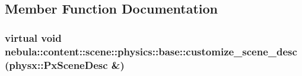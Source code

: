 \subsection{Member Function Documentation}
\hypertarget{classnebula_1_1content_1_1scene_1_1physics_1_1base_a2bd70fe2ca923b841d703cf26e52f931}{
\subsubsection[{customize\_\-scene\_\-desc}]{\setlength{\rightskip}{0pt plus 5cm}virtual void nebula::content::scene::physics::base::customize\_\-scene\_\-desc (physx::PxSceneDesc \&)}}
\label{classnebula_1_1content_1_1scene_1_1physics_1_1base_a2bd70fe2ca923b841d703cf26e52f931}


